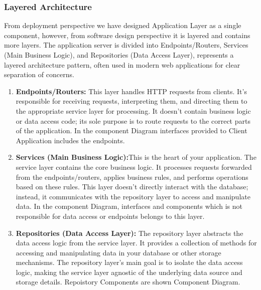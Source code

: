 \subsubsection{Layered Architecture}
From deployment perspective we have designed Application Layer as a single component, however, from software design perspective it is layered and contains more layers. The application server is divided into Endpoints/Routers, Services (Main Business Logic), and Repositories (Data Access Layer), represents a layered architecture pattern, often used in modern web applications for clear separation of concerns. \\
\begin{enumerate}
\item \textbf{Endpoints/Routers:} This layer handles HTTP requests from clients. It's responsible for receiving requests, interpreting them, and directing them to the appropriate service layer for processing. It doesn't contain business logic or data access code; its sole purpose is to route requests to the correct parts of the application. In the component Diagram interfaces provided to Client Application includes the endpoints.

\item \textbf{Services (Main Business Logic):}This is the heart of your application. The service layer contains the core business logic. It processes requests forwarded from the endpoints/routers, applies business rules, and performs operations based on these rules. This layer doesn't directly interact with the database; instead, it communicates with the repository layer to access and manipulate data. In the component Diagram, interfaces and components which is not responsible for data access or endpoints belongs to this layer.

\item \textbf{Repositories (Data Access Layer): }The repository layer abstracts the data access logic from the service layer. It provides a collection of methods for accessing and manipulating data in your database or other storage mechanisms. The repository layer's main goal is to isolate the data access logic, making the service layer agnostic of the underlying data source and storage details. Repoistory Components are shown Component Diagram.
\end{enumerate}

